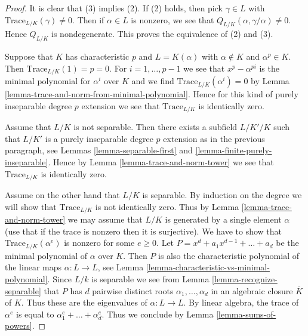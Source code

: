 \documentclass[10pt,a4paper]{amsart}
\theoremstyle{plain}
\theoremstyle{definition}
\theoremstyle{remark}
\numberwithin{equation}{subsection}
\begin{document}
\begin{proof}
It is clear that (3) implies (2). If (2) holds, then pick $\gamma \in L$
with $\text{Trace}_{L/K}(\gamma) \not = 0$. Then if $\alpha \in L$
is nonzero, we see that $Q_{L/K}(\alpha, \gamma/\alpha) \not = 0$.
Hence $Q_{L/K}$ is nondegenerate. This proves the equivalence of
(2) and (3).

\medskip\noindent
Suppose that $K$ has characteristic $p$ and $L = K(\alpha)$ with
$\alpha \not \in K$ and $\alpha^p \in K$. Then $\text{Trace}_{L/K}(1) = p = 0$.
For $i = 1, \ldots, p - 1$ we see that $x^p - \alpha^{pi}$ is the minimal
polynomial for $\alpha^i$ over $K$ and we find
$\text{Trace}_{L/K}(\alpha^i) = 0$ by
Lemma \ref{lemma-trace-and-norm-from-minimal-polynomial}.
Hence for this kind of purely inseparable degree $p$ extension
we see that $\text{Trace}_{L/K}$ is identically zero.

\medskip\noindent
Assume that $L/K$ is not separable. Then there exists a subfield
$L/K'/K$ such that $L/K'$ is a purely inseparable degree $p$ extension
as in the previous paragraph, see
Lemmas \ref{lemma-separable-first} and \ref{lemma-finite-purely-inseparable}.
Hence by Lemma \ref{lemma-trace-and-norm-tower}
we see that $\text{Trace}_{L/K}$ is identically zero.

\medskip\noindent
Assume on the other hand that $L/K$ is separable.
By induction on the degree we will show that
$\text{Trace}_{L/K}$ is not identically zero.
Thus by Lemma \ref{lemma-trace-and-norm-tower} we may assume that
$L/K$ is generated by a single element $\alpha$ (use that if
the trace is nonzero then it is surjective).
We have to show that $\text{Trace}_{L/K}(\alpha^e)$
is nonzero for some $e \geq 0$.
Let $P = x^d + a_1 x^{d - 1} + \ldots + a_d$ be the minimal
polynomial of $\alpha$ over $K$.
Then $P$ is also the characteristic polynomial of the linear
maps $\alpha : L \to L$, see
Lemma \ref{lemma-characteristic-vs-minimal-polynomial}.
Since $L/k$ is separable we see from Lemma \ref{lemma-recognize-separable}
that $P$ has $d$ pairwise distinct roots $\alpha_1, \ldots, \alpha_d$
in an algebraic closure $\overline{K}$ of $K$. Thus these are the
eigenvalues of $\alpha : L \to L$.
By linear algebra, the trace of $\alpha^e$ is
equal to $\alpha_1^e + \ldots + \alpha_d^e$.
Thus we conclude by Lemma \ref{lemma-sums-of-powers}.
\end{proof}
\end{document}
